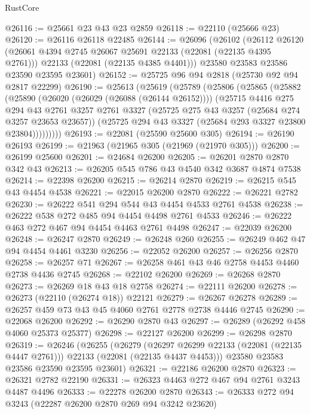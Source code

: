 \begin{lexlean}{RustCore}
\begin{coremodule}
@26116 := @25661 @23 @43 @23 @2859
@26118 := @22110 (@25666 @23)
@26120 := @26116 @26118 @22485
@26144 := @26096
    (@26102
      (@26112
        @26120
        (@26061 @4394 @2745 @26067 @25691 @22133 (@22081 (@22135 @4395 @2761)))
        @22133
        (@22081 (@22135 @4385 @4401)))
      @23580
      @23583
      @23586
      @23590
      @23595
      @23601)
@26152 := @25725 @96 @94 @2818 (@25730 @92 @94 @2817 @22299)
@26190 := @25613
    (@25619
      (@25789
        (@25806
          (@25865
            (@25882
              (@25890
                (@26020 (@26029 (@26088 (@26144 @26152))))
                (@25715
                  @4416
                  @275
                  @294
                  @43
                  @2761
                  @3257
                  @2761
                  @3327
                  (@25725 @275 @43 @3257 (@25684 @274 @3257 @23653 @23657))
                  (@25725 @294 @43 @3327 (@25684 @293 @3327 @23800 @23804)))))))))
@26193 := @22081 (@25590 @25600 @305)
@26194 := @26190 @26193
@26199 := @21963 (@21965 @305 (@21969 (@21970 @305)))
@26200 := @26199 @25600
@26201 := @24684 @26200
@26205 := @26201 @2870 @2870 @342 @43
@26213 := @26205 @545 @786 @43 @4540 @342 @3687 @4874 @7538
@26214 := @22398 @26200
@26215 := @26214 @2870
@26219 := @26215 @545 @43 @4454 @4538
@26221 := @22015 @26200 @2870
@26222 := @26221 @2782
@26230 := @26222 @541 @294 @544 @43 @4454 @4533 @2761 @4538
@26238 := @26222 @538 @272 @485 @94 @4454 @4498 @2761 @4533
@26246 := @26222 @463 @272 @467 @94 @4454 @4463 @2761 @4498
@26247 := @22039 @26200
@26248 := @26247 @2870
@26249 := @26248 @260
@26255 := @26249 @462 @47 @94 @4454 @4461 @3230
@26256 := @22052 @26200
@26257 := @26256 @2870
@26258 := @26257 @71
@26267 := @26258 @461 @43 @46 @2758 @4453 @4460 @2738 @4436 @2745
@26268 := @22102 @26200
@26269 := @26268 @2870
@26273 := @26269 @18 @43 @18 @2758
@26274 := @22111 @26200
@26278 := @26273 (@22110 (@26274 @18)) @22121
@26279 := @26267 @26278
@26289 := @26257 @459 @73 @43 @45 @4060 @2761 @2778 @2738 @4446 @2745
@26290 := @22068 @26200
@26292 := @26290 @2870 @43
@26297 := @26289 (@26292 @458 @4060 @25373 @25377)
@26298 := @22127 @26200
@26299 := @26298 @2870
@26319 := @26246
    (@26255
      (@26279
        (@26297 @26299 @22133 (@22081 (@22135 @4447 @2761)))
        @22133
        (@22081 (@22135 @4437 @4453)))
      @23580
      @23583
      @23586
      @23590
      @23595
      @23601)
@26321 := @22186 @26200 @2870
@26323 := @26321 @2782 @22190
@26331 := @26323 @4463 @272 @467 @94 @2761 @3243 @4487 @4496
@26333 := @22278 @26200 @2870
@26343 := @26333 @272 @94 @3243 (@22287 @26200 @2870 @269 @94 @3242 @23620)

\end{coremodule}
\end{lexlean}
